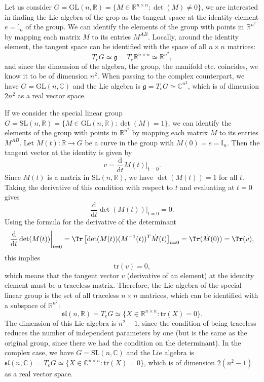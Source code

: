 \begin{example}
    Let us consider \(G = \mathrm{GL}(n, \mathbb{R}) = \{M \in \mathbb{R}^{n\times n} : \det(M) \neq 0\}\), we are interested in finding the Lie algebra of the grop as the tangent space at the identity element \(e = \mathbb{I}_n\) of the group. We can identify the elements of the group with points in \(\mathbb{R}^{n^2}\) by mapping each matrix \(M\) to its entries \(M^{AB}\). Locally, around the identity element, the tangent space can be identified with the space of all \(n \times n\) matrices:
    \[
        T_e G \simeq \mathfrak{g} = T_e \mathbb{R}^{n \times n} \simeq \mathbb{R}^{n^2},
    \]
    and since the dimension of the algebra, the group, the manifold etc. coincides, we know it to be of dimension \(n^2\). When passing to the complex counterpart, we have \(G = \mathrm{GL}(n, \mathbb{C})\) and the Lie algebra is \(\mathfrak{g} = T_e G \simeq \mathbb{C}^{n^2}\), which is of dimension \(2n^2\) as a real vector space.
\end{example}

\begin{example}
    If we consider the special linear group \(G = \mathrm{SL}(n, \mathbb{R}) = \{M \in \mathrm{GL}(n, \mathbb{R}) : \det(M) = 1\}\), we can identify the elements of the group with points in \(\mathbb{R}^{n^2}\) by mapping each matrix \(M\) to its entries \(M^{AB}\). Let \(M(t) : \mathbb{R} \to G\) be a curve in the group with \(M(0) = e = \mathbb{I}_n\). Then the tangent vector at the identity is given by
    \[
        v = \frac{\mathrm{d}}{\mathrm{d} t} M(t) \bigg|_{t=0}.
    \]
    Since \(M(t)\) is a matrix in \(\mathrm{SL}(n, \mathbb{R})\), we have \(\det(M(t)) = 1\) for all \(t\). Taking the derivative of this condition with respect to \(t\) and evaluating at \(t = 0\) gives
    \[
        \frac{\mathrm{d}}{\mathrm{d} t} \det(M(t)) \bigg|_{t=0} = 0.
    \]
    Using the formula for the derivative of the determinant
    \[
        \frac{\mathrm{d}}{\mathrm{d} t} \det(M(t)) \bigg|_{t=0} = \Tr\left[\det(M(t)) (M^{-1}(t))^T \dot{M}(t)\right]_{t=0} = \Tr(\dot{M}(0)) = \Tr(v),
    \]
    this implies
    \[
        \mathrm{tr}(v) = 0,
    \]
    which means that the tangent vector \(v\) (derivative of an element) at the identity element must be a traceless matrix. Therefore, the Lie algebra of the special linear group is the set of all traceless \(n \times n\) matrices, which can be identified with a subspace of \(\mathbb{R}^{n^2}\):
    \[
        \mathfrak{sl}(n, \mathbb{R}) = T_e G \simeq \{X \in \mathbb{R}^{n \times n} : \mathrm{tr}(X) = 0\}.
    \]
    The dimension of this Lie algebra is \(n^2 - 1\), since the condition of being traceless reduces the number of independent parameters by one (but is the same as the original group, since there we had the condition on the determinant). In the complex case, we have \(G = \mathrm{SL}(n, \mathbb{C})\) and the Lie algebra is \(\mathfrak{sl}(n, \mathbb{C}) = T_e G \simeq \{X \in \mathbb{C}^{n \times n} : \mathrm{tr}(X) = 0\}\), which is of dimension \(2(n^2 - 1)\) as a real vector space.
\end{example}

